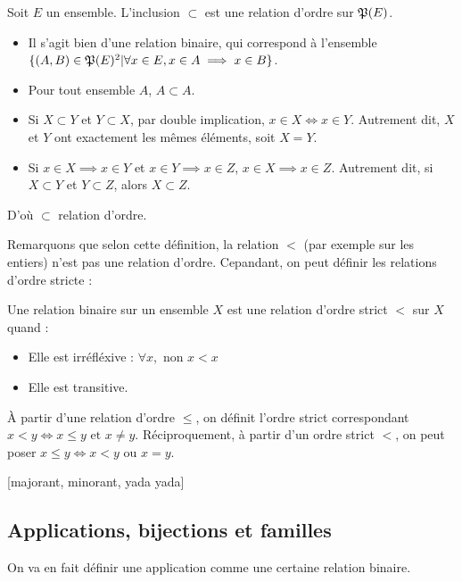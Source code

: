 \begin{prop}
    Soit $E$ un ensemble. L'inclusion $\subset$ est une relation d'ordre sur $\mathfrak{P}(E)$.
\end{prop}
\begin{demo}
\begin{itemize}
    \item Il s'agit bien d'une relation binaire, qui correspond à l'ensemble $\{(A,B)\in \mathfrak{P}(E)^2 | \forall x\in E, x\in A \implies x\in B\}$.
    \item Pour tout ensemble $A$, $A\subset A$.
    \item Si $X\subset Y$ et $Y\subset X$, par double implication, $x \in X \iff x\in Y$. Autrement dit, $X$ et $Y$ ont exactement les mêmes éléments, soit $X=Y$.
    \item Si $x\in X \implies x\in Y$ et $x\in Y \implies x\in Z$, $x\in X \implies x\in Z$. Autrement dit, si $X\subset Y$ et $Y\subset Z$, alors $X\subset Z$.
\end{itemize}
D'où $\subset$ relation d'ordre.
\end{demo}

Remarquons que selon cette définition, la relation $<$ (par exemple sur les entiers) n'est pas une relation d'ordre. Cepandant, on peut définir les relations d'ordre stricte :

\begin{defini}
    Une relation binaire sur un ensemble $X$ est une relation d'ordre strict $<$ sur $X$ quand :
    \begin{itemize}
        \item Elle est irréfléxive : $\forall x, \text{ non } x < x$
        \item Elle est transitive.
    \end{itemize}
\end{defini}

À partir d'une relation d'ordre $\leq$, on définit l'ordre strict correspondant $x<y \iff x\leq y \text{ et } x\neq y$. Réciproquement, à partir d'un ordre strict $<$, on peut poser $x\leq y \iff x<y \text{ ou } x=y$.

[majorant, minorant, yada yada]

\subsection*{Applications, bijections et familles}
On va en fait définir une application comme une certaine relation binaire.

\begin{defini}
    
\end{defini}

